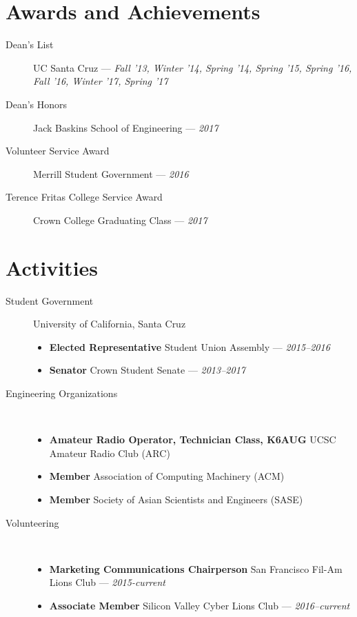 \documentclass[10pt]{article}
\begin{document}
\section*{Awards and Achievements}
\begin{description}
  \item[Dean's List] UC Santa Cruz --- \textit{Fall '13, Winter '14, Spring '14, Spring '15,
    Spring '16, Fall '16, Winter '17, Spring '17}
  \item[Dean's Honors] Jack Baskins School of Engineering --- \textit{2017}
  \item[Volunteer Service Award] Merrill Student Government --- \textit{2016}
  \item[Terence Fritas College Service Award] Crown College Graduating Class --- \textit{2017}
\end{description}

\section*{Activities}
\begin{description}
  \item[Student Government] University of California, Santa Cruz
    \begin{itemize}
      \item \textbf{Elected Representative} Student Union Assembly --- \textit{2015--2016}
      \item \textbf{Senator} Crown Student Senate --- \textit{2013--2017}
    \end{itemize}
  \item[Engineering Organizations] ~
    \begin{itemize}
      \item \textbf{Amateur Radio Operator, Technician Class, K6AUG} UCSC Amateur Radio Club (ARC)
      \item \textbf{Member} Association of Computing Machinery (ACM)
      \item \textbf{Member} Society of Asian Scientists and Engineers (SASE)
    \end{itemize}
  \item[Volunteering] ~
    \begin{itemize}
      \item \textbf{Marketing Communications Chairperson} San Francisco
        Fil-Am Lions Club --- \textit{2015-current}
      \item \textbf{Associate Member} Silicon Valley Cyber Lions Club ---
        \textit{2016--current}
    \end{itemize}
\end{description}
\end{document}
